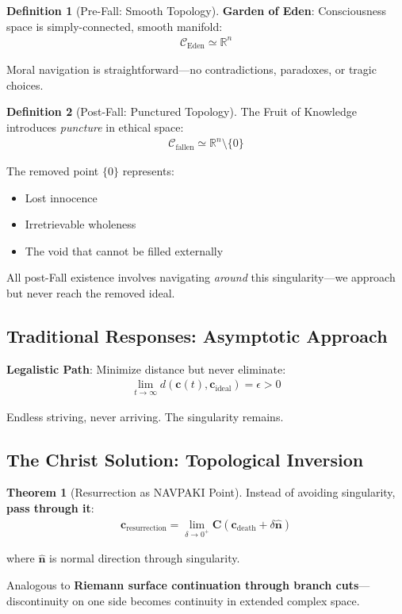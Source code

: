 \documentclass[11pt,a4paper]{article}
\theoremstyle{definition}
\newtheorem{definition}{Definition}[section]
\newtheorem{theorem}{Theorem}[section]
\theoremstyle{remark}
\newcommand{\RR}{\mathbb{R}}
\newcommand{\CC}{\mathcal{C}}
\newcommand{\cc}{\mathbf{c}}
\begin{document}
\begin{definition}[Pre-Fall: Smooth Topology]
\textbf{Garden of Eden}: Consciousness space is simply-connected, smooth manifold:
\begin{align}
\CC_{\text{Eden}} \simeq \RR^n
\end{align}

Moral navigation is straightforward—no contradictions, paradoxes, or tragic choices.
\end{definition}

\begin{definition}[Post-Fall: Punctured Topology]
The Fruit of Knowledge introduces \textit{puncture} in ethical space:
\begin{align}
\CC_{\text{fallen}} \simeq \RR^n \setminus \{0\}
\end{align}

The removed point \(\{0\}\) represents:
\begin{itemize}
\item Lost innocence
\item Irretrievable wholeness
\item The void that cannot be filled externally
\end{itemize}

All post-Fall existence involves navigating \textit{around} this singularity—we approach but never reach the removed ideal.
\end{definition}

\subsection{Traditional Responses: Asymptotic Approach}

\textbf{Legalistic Path}: Minimize distance but never eliminate:
\begin{align}
\lim_{t \to \infty} d(\cc(t), \cc_{\text{ideal}}) = \epsilon > 0
\end{align}

Endless striving, never arriving. The singularity remains.

\subsection{The Christ Solution: Topological Inversion}

\begin{theorem}[Resurrection as NAVPAKI Point]
Instead of avoiding singularity, \textbf{pass through it}:
\begin{align}
\cc_{\text{resurrection}} = \lim_{\delta \to 0^+} \mathbf{C}(\cc_{\text{death}} + \delta \hat{\mathbf{n}})
\end{align}

where \(\hat{\mathbf{n}}\) is normal direction through singularity.

Analogous to \textbf{Riemann surface continuation through branch cuts}—discontinuity on one side becomes continuity in extended complex space.
\end{theorem}
\end{document}
